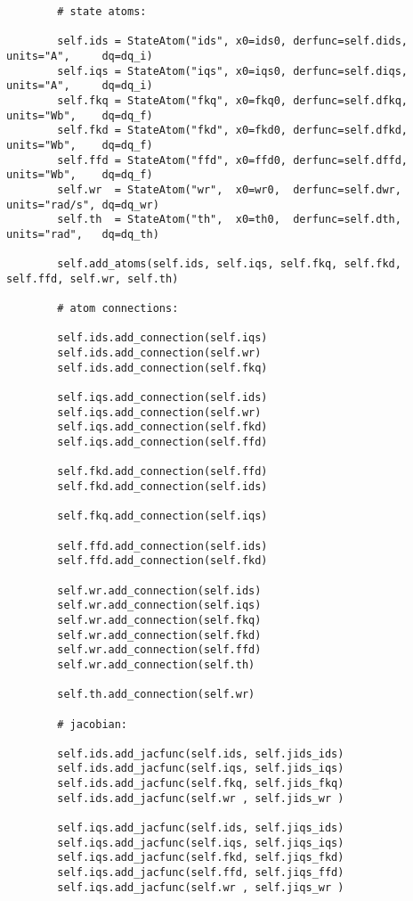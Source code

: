 \begin{lstlisting}
        # state atoms:

        self.ids = StateAtom("ids", x0=ids0, derfunc=self.dids, units="A",     dq=dq_i)
        self.iqs = StateAtom("iqs", x0=iqs0, derfunc=self.diqs, units="A",     dq=dq_i)
        self.fkq = StateAtom("fkq", x0=fkq0, derfunc=self.dfkq, units="Wb",    dq=dq_f)
        self.fkd = StateAtom("fkd", x0=fkd0, derfunc=self.dfkd, units="Wb",    dq=dq_f)
        self.ffd = StateAtom("ffd", x0=ffd0, derfunc=self.dffd, units="Wb",    dq=dq_f)
        self.wr  = StateAtom("wr",  x0=wr0,  derfunc=self.dwr,  units="rad/s", dq=dq_wr)
        self.th  = StateAtom("th",  x0=th0,  derfunc=self.dth,  units="rad",   dq=dq_th)

        self.add_atoms(self.ids, self.iqs, self.fkq, self.fkd, self.ffd, self.wr, self.th)

        # atom connections:

        self.ids.add_connection(self.iqs)
        self.ids.add_connection(self.wr)
        self.ids.add_connection(self.fkq)

        self.iqs.add_connection(self.ids)
        self.iqs.add_connection(self.wr)
        self.iqs.add_connection(self.fkd)
        self.iqs.add_connection(self.ffd)

        self.fkd.add_connection(self.ffd)
        self.fkd.add_connection(self.ids)

        self.fkq.add_connection(self.iqs)

        self.ffd.add_connection(self.ids)
        self.ffd.add_connection(self.fkd)

        self.wr.add_connection(self.ids)
        self.wr.add_connection(self.iqs)
        self.wr.add_connection(self.fkq)
        self.wr.add_connection(self.fkd)
        self.wr.add_connection(self.ffd)
        self.wr.add_connection(self.th)

        self.th.add_connection(self.wr)

        # jacobian:

        self.ids.add_jacfunc(self.ids, self.jids_ids)
        self.ids.add_jacfunc(self.iqs, self.jids_iqs)
        self.ids.add_jacfunc(self.fkq, self.jids_fkq)
        self.ids.add_jacfunc(self.wr , self.jids_wr )

        self.iqs.add_jacfunc(self.ids, self.jiqs_ids)
        self.iqs.add_jacfunc(self.iqs, self.jiqs_iqs)
        self.iqs.add_jacfunc(self.fkd, self.jiqs_fkd)
        self.iqs.add_jacfunc(self.ffd, self.jiqs_ffd)
        self.iqs.add_jacfunc(self.wr , self.jiqs_wr )


\end{lstlisting}
